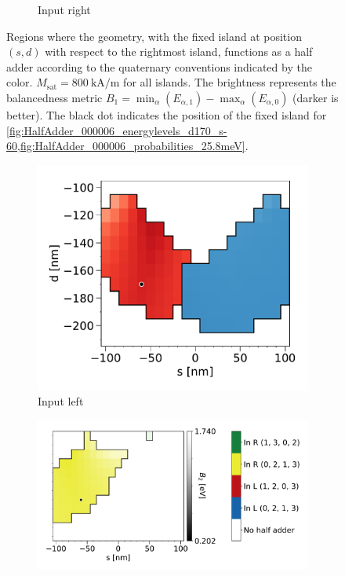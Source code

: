 \documentclass[11pt,a4paper,english,twoside]{article}
\begin{document}
\begin{figure}
\begin{subfigure}[t]{0.594\textwidth}
        \caption{Input right}
    \label{fig:HalfAdder_000006_sweep_d-s_balanced1-R}
    \end{subfigure}
    \caption{Regions where the geometry, with the fixed island at position $(s, d)$ with respect to the rightmost island, functions as a half adder according to the quaternary conventions indicated by the color. $M_\mathrm{sat} = \SI{800}{\kilo\ampere\per\metre}$ for all islands. The brightness represents the balancedness metric $B_1 = \min_\alpha(E_{\alpha,1}) - \max_\alpha(E_{\alpha,0})$ (darker is better). The black dot indicates the position of the fixed island for \cref{fig:HalfAdder_000006_energylevels_d170_s-60,fig:HalfAdder_000006_probabilities_25.8meV}.}
    \label{fig:HalfAdder_000006_sweep_d-s_balanced1}
\end{figure}
\begin{figure}
    \centering
    \begin{subfigure}[t]{0.396\textwidth}
        \includegraphics[width=\textwidth]{Figures/half_adder/sweep/000006_d-s/table(d100-210_10,s-100-100_10)_balanced2_L.pdf}
        \caption{Input left}
    \label{fig:HalfAdder_000006_sweep_d-s_balanced2-L}
    \end{subfigure}
    \begin{subfigure}[t]{0.594\textwidth}
        \includegraphics[width=\textwidth]{Figures/half_adder/sweep/000006_d-s/table(d100-210_10,s-100-100_10)_balanced2_R.pdf}

\end{subfigure}
\end{figure}
\end{document}
